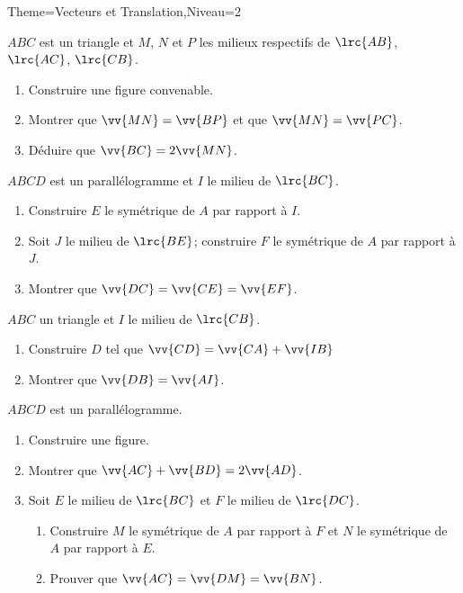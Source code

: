 \documentclass[a4paper,12pt]{article}
\begin{document}
\begin{Maquette}[Fiche]{Theme=Vecteurs et Translation,Niveau=2}

\begin{exercice}
$ABC$ est un triangle et $M$, $N$ et $P$ les milieux respectifs de $\lrc{AB}$,  $\lrc{AC}$,  $\lrc{CB}$.
\begin{enumerate}
\item Construire une figure convenable.
\item Montrer que $\vv{MN}=\vv{BP}$ et que $\vv{MN}=\vv{PC}$.
\item Déduire que $\vv{BC}=2\vv{MN}$.
\end{enumerate}
\end{exercice}

\begin{exercice}
$ABCD$ est un parallélogramme et $I$ le milieu de $\lrc{BC}$.
\begin{enumerate}
\item Construire $E$ le symétrique de $A$ par rapport à $I$.
\item Soit $J$ le milieu de $\lrc{BE}$; construire $F$ le symétrique de $A$ par rapport à $J$.
\item Montrer que $\vv{DC}=\vv{CE}=\vv{EF}$.
\end{enumerate}
\end{exercice}

\begin{exercice}
$ABC$ un triangle et $I$ le milieu de $\lrc{CB}$.
\begin{enumerate}
\item Construire $D$ tel que $\vv{CD}=\vv{CA}+\vv{IB}$
\item Montrer que $\vv{DB}=\vv{AI}$.
\end{enumerate}
\end{exercice}

\begin{exercice}
$ABCD$ est un parallélogramme.
\begin{enumerate}
\item Construire une figure.
\item Montrer que $\vv{AC}+\vv{BD}=2\vv{AD}$.
\item Soit $E$ le milieu de $\lrc{BC}$ et $F$ le milieu de $\lrc{DC}$.
\begin{enumerate}
\item Construire $M$ le symétrique de $A$ par rapport à $F$ et $N$ le symétrique de $A$ par rapport à $E$.
\item Prouver que  $\vv{AC}=\vv{DM}=\vv{BN}$.
\end{enumerate}
\end{enumerate}
\end{exercice}


\end{Maquette}
\end{document}
